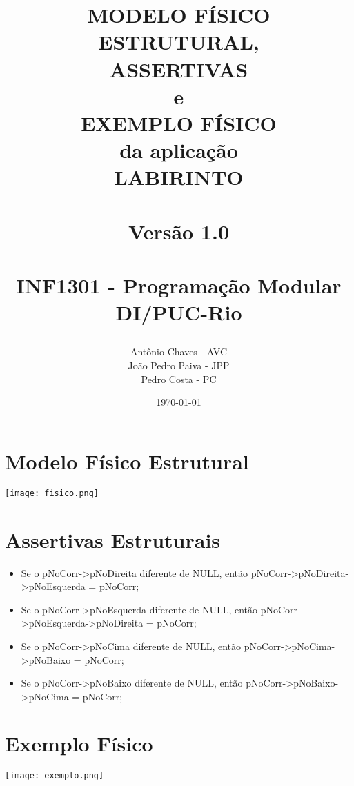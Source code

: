 \documentclass[a4paper,12pt,oneside]{book}
\title{
  \begin{flushright}
  \Huge{MODELO FÍSICO ESTRUTURAL,}\\
  ASSERTIVAS\\
  e\\
  EXEMPLO FÍSICO\\
  da aplicação\\
  LABIRINTO\\
  ~\\
  \LARGE{Versão 1.0}\\
  ~\\
  INF1301 - Programação Modular\\ DI/PUC-Rio
  \end{flushright}
}
\author{Antônio Chaves - AVC\\João Pedro Paiva - JPP\\Pedro Costa - PC}
\date{\today}
\begin{document}
\frontmatter
\maketitle

\tableofcontents



\mainmatter

\chapter{Modelo Físico Estrutural}

\begin{center}

    \texttt{[image: fisico.png]}

\end{center}

\chapter{Assertivas Estruturais}

\begin{itemize}

    \item Se o pNoCorr->pNoDireita diferente de NULL, então pNoCorr->pNoDireita->pNoEsquerda = pNoCorr;
    \item Se o pNoCorr->pNoEsquerda diferente de NULL, então pNoCorr->pNoEsquerda->pNoDireita = pNoCorr;
    \item Se o pNoCorr->pNoCima diferente de NULL, então pNoCorr->pNoCima->pNoBaixo = pNoCorr;
    \item Se o pNoCorr->pNoBaixo diferente de NULL, então pNoCorr->pNoBaixo->pNoCima = pNoCorr;

\end{itemize}

\chapter{Exemplo Físico}

\begin{center}
    
    \texttt{[image: exemplo.png]}

\end{center}

% 
% 
% 
% 
% 
% 
% 
\end{document}
